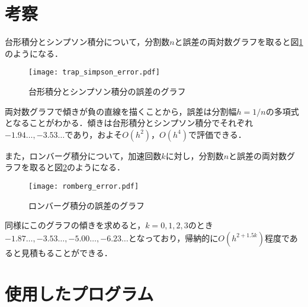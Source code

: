 \documentclass[a4paper]{bxjsarticle}
\begin{document}
	\section{考察}
	台形積分とシンプソン積分について，分割数$n$と誤差の両対数グラフを取ると図\ref{fig:trap_simpson_error}のようになる．

	\begin{figure}[bt]
		\begin{center}
			\texttt{[image: trap\_simpson\_error.pdf]}
		\end{center}
		\caption{台形積分とシンプソン積分の誤差のグラフ}
		\label{fig:trap_simpson_error}
	\end{figure}

	両対数グラフで傾きが負の直線を描くことから，誤差は分割幅$h=1/n$の多項式となることがわかる．傾きは台形積分とシンプソン積分でそれぞれ$-1.94\dots, -3.53\dots$であり，およそ$O(h^2)$，$O(h^4)$で評価できる．

	また，ロンバーグ積分について，加速回数$k$に対し，分割数$n$と誤差の両対数グラフを取ると図\ref{fig:romberg_error}のようになる．

	\begin{figure}[bt]
		\begin{center}
			\texttt{[image: romberg\_error.pdf]}
		\end{center}
		\caption{ロンバーグ積分の誤差のグラフ}
		\label{fig:romberg_error}
	\end{figure}

	同様にこのグラフの傾きを求めると，$k=0,1,2,3$のとき$-1.87\dots, -3.53\dots, -5.00\dots, -6.23\dots$となっており，帰納的に$O(h^{2+1.5k})$程度であると見積もることができる．


	\appendix
	\section{使用したプログラム} \label{sec:program}
\end{document}

